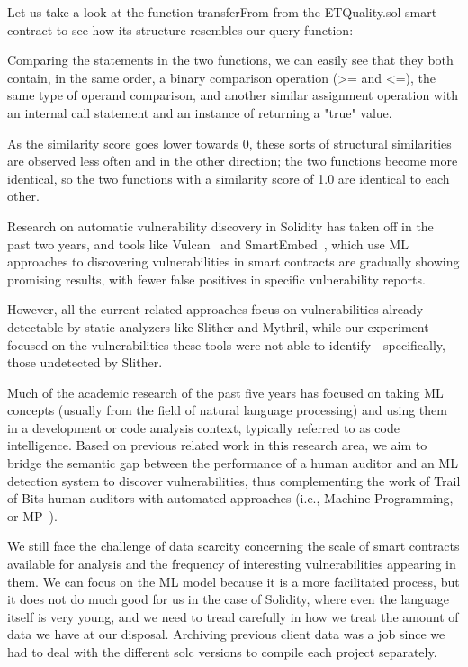 Let us take a look at the function transferFrom from the ETQuality.sol smart contract to see how its structure resembles our query function:

Comparing the statements in the two functions, we can easily see that they both contain, in the same order, a binary comparison operation (>= and <=), the same type of operand comparison, and another similar assignment operation with an internal call statement and an instance of returning a "true" value.

As the similarity score goes lower towards 0, these sorts of structural similarities are observed less often and in the other direction; the two functions become more identical, so the two
functions with a similarity score of 1.0 are identical to each other.

Research on automatic vulnerability discovery in Solidity has taken off in the past two years, and tools like Vulcan~\cite{srikant2020vulcan} and SmartEmbed~\cite{gao2019smartembed},
which use ML approaches to discovering vulnerabilities in
smart contracts are gradually showing promising results, with fewer false positives in specific vulnerability reports.

However, all the current related approaches focus on vulnerabilities already detectable by static analyzers like Slither and Mythril, while our experiment focused on the vulnerabilities these
tools were not able to identify—specifically, those undetected by Slither.

Much of the academic research of the past five years has focused on taking ML concepts (usually from the field of natural language processing) and using them in a development or code analysis context,
typically referred to as code intelligence.
Based on previous related work in this research area, we aim to bridge the semantic gap between the performance of a human auditor and an ML detection system to discover vulnerabilities, thus
complementing the work of Trail of Bits human auditors with automated approaches (i.e., Machine Programming, or MP~\cite{gottschlich2018three}).

We still face the challenge of data scarcity concerning the scale of smart contracts available for analysis and the frequency of interesting vulnerabilities appearing in them.
We can focus on the ML model because it is a more facilitated process, but it does not do much good for us in the case of Solidity, where even the language itself is very young, and we need to
tread carefully in how we treat the amount of data we have at our disposal.
Archiving previous client data was a job since we had to deal with the different solc versions to compile each project separately.

